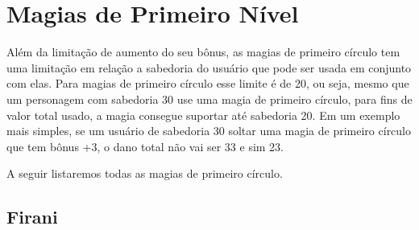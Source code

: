 \section{Magias de Primeiro Nível}

Além da limitação de aumento do seu bônus, as magias de primeiro círculo tem uma limitação em relação a sabedoria do usuário que pode ser usada em conjunto com elas. Para magias de primeiro círculo esse limite é de 20, ou seja, mesmo que um personagem com sabedoria 30 use uma magia de primeiro círculo, para fins de valor total usado, a magia consegue suportar até sabedoria 20. Em um exemplo mais simples, se um usuário de sabedoria 30 soltar uma magia de primeiro círculo que tem bônus +3, o dano total não vai ser 33 e sim 23.

A seguir listaremos todas as magias de primeiro círculo.

\subsection{Firani}

